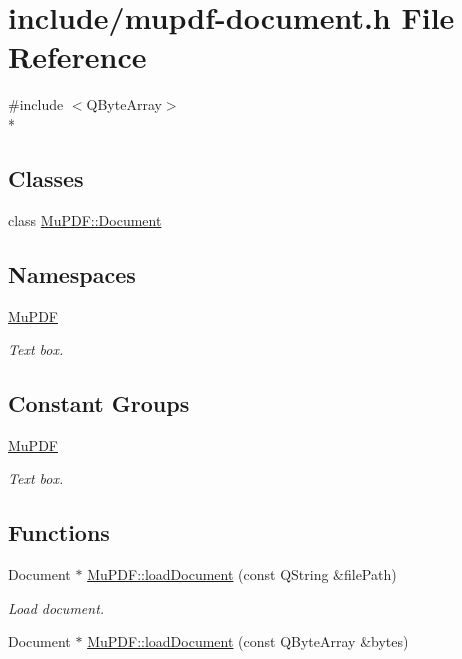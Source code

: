 \hypertarget{mupdf-document_8h}{\section{include/mupdf-\/document.h File Reference}
\label{mupdf-document_8h}
}
{\ttfamily \#include $<$Q\-Byte\-Array$>$}\\*
\subsection*{Classes}
\begin{DoxyCompactItemize}
\item 
class \hyperlink{class_mu_p_d_f_1_1_document}{Mu\-P\-D\-F\-::\-Document}
\end{DoxyCompactItemize}
\subsection*{Namespaces}
\begin{DoxyCompactItemize}
\item 
\hyperlink{namespace_mu_p_d_f}{Mu\-P\-D\-F}
\begin{DoxyCompactList}\small\item\em Text box. \end{DoxyCompactList}\end{DoxyCompactItemize}
\subsection*{Constant Groups}
\begin{DoxyCompactItemize}
\item 
\hyperlink{namespace_mu_p_d_f}{Mu\-P\-D\-F}
\begin{DoxyCompactList}\small\item\em Text box. \end{DoxyCompactList}\end{DoxyCompactItemize}
\subsection*{Functions}
\begin{DoxyCompactItemize}
\item 
Document $\ast$ \hyperlink{namespace_mu_p_d_f_a5cf746094bc9648aca0d4a83e3ac44b3}{Mu\-P\-D\-F\-::load\-Document} (const Q\-String \&file\-Path)
\begin{DoxyCompactList}\small\item\em Load document. \end{DoxyCompactList}\item 
Document $\ast$ \hyperlink{namespace_mu_p_d_f_a294a09188a3dcab290679752dfc8d52b}{Mu\-P\-D\-F\-::load\-Document} (const Q\-Byte\-Array \&bytes)
\end{DoxyCompactItemize}
